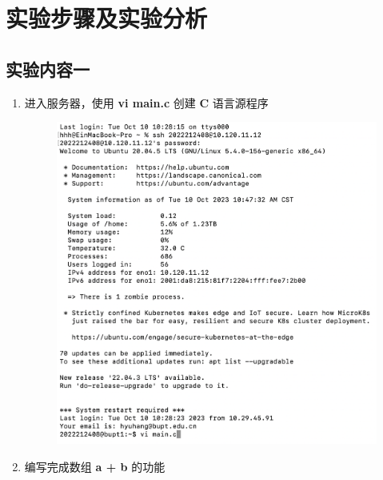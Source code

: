 \documentclass[UTF8, 12pt, a4paper, oneside]{ctexart}
\begin{document}
    \newpage
    \section{实验步骤及实验分析}
        \subsection{实验内容一}
            \begin{enumerate}
                \item 进入服务器，使用 \textbf{vi main.c} 创建 \textbf{C} 语言源程序
                    \begin{figure}[htbp]
                        \includegraphics*[width = 15cm]{1.1.png}
                    \end{figure}
                \newpage
                \item 编写完成数组 \textbf{a + b} 的功能
                    \begin{figure}[htbp]

\end{figure}
\end{enumerate}
\end{document}
